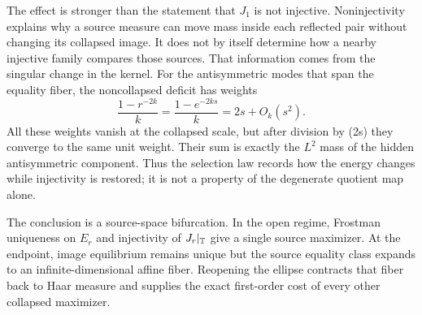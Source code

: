 The effect is stronger than the statement that \(J_1\) is not
injective.  Noninjectivity explains why a source measure can move mass
inside each reflected pair without changing its collapsed image.  It
does not by itself determine how a nearby injective family compares
those sources.  That information comes from the singular change in the
kernel.  For the antisymmetric modes that span the equality fiber, the
noncollapsed deficit has weights
\begin{equation}\label{eq:vanishing-weights}
 \frac{1-r^{-2k}}{k}
 =\frac{1-e^{-2ks}}{k}
 =2s+O_k(s^2).
\end{equation}
All these weights vanish at the collapsed scale, but after division by
(2s) they converge to the same unit weight.  Their sum is exactly the
\(L^2\) mass of the hidden antisymmetric component.  Thus the selection
law records how the energy changes while injectivity is restored; it is
not a property of the degenerate quotient map alone.

The conclusion is a source-space bifurcation.  In the open regime,
Frostman uniqueness on \(E_r\) and injectivity of \(J_r|_{\mathbb{T}}\) give a
single source maximizer.  At the endpoint, image equilibrium remains
unique but the source equality class expands to an
infinite-dimensional affine fiber.  Reopening the ellipse contracts
that fiber back to Haar measure and supplies the exact first-order cost
of every other collapsed maximizer.
